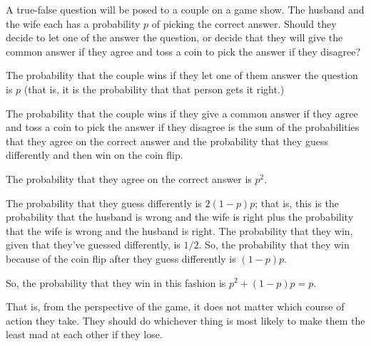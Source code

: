 \begin{problem}[Handout 4, \# 12]
  A true-false question will be posed to a couple on a game show. The
  husband and the wife each has a probability \(p\) of picking the correct
  answer. Should they decide to let one of the answer the question, or
  decide that they will give the common answer if they agree and toss a
  coin to pick the answer if they disagree?
\end{problem}
\begin{solution}
  The probability that the couple wins if they let one of them answer the
  question is $p$ (that is, it is the probability that that person gets it
  right.)

  The probability that the couple wins if they give a common answer if they
  agree and toss a coin to pick the answer if they disagree is the sum of
  the probabilities that they agree on the correct answer and the
  probability that they guess differently and then win on the coin flip.

  The probability that they agree on the correct answer is $p^2$.

  The probability that they guess differently is $2(1-p)p$; that is, this
  is the probability that the husband is wrong and the wife is right plus
  the probability that the wife is wrong and the husband is right. The
  probability that they win, given that they've guessed differently, is
  $1/2$. So, the probability that they win because of the coin flip after
  they guess differently is $(1-p)p$.

  So, the probability that they win in this fashion is $p^2 + (1-p)p = p$.

  That is, from the perspective of the game, it does not matter which
  course of action they take. They should do whichever thing is most likely
  to make them the least mad at each other if they lose.
\end{solution}
\newpage

